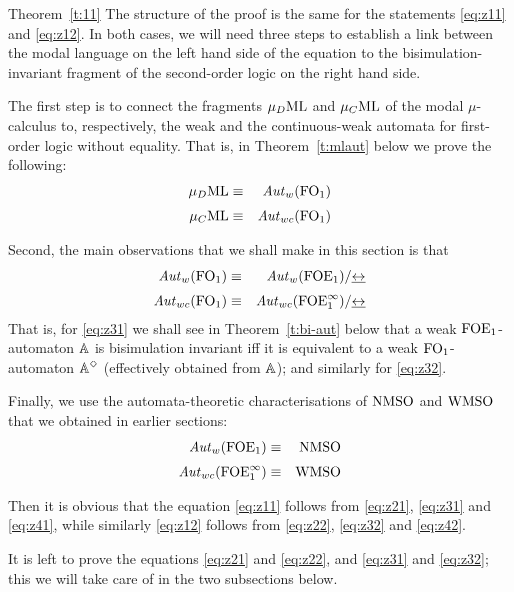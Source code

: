 \begin{proofof}{Theorem~\ref{t:11}}
The structure of the proof is the same for the statements \eqref{eq:z11} and
\eqref{eq:z12}.
In both cases, we will need three steps to establish a link between the modal 
language on the left hand side of the equation to the bisimulation-invariant 
fragment of the second-order logic on the right hand side.

The first step is to connect the fragments $\mu_{D}\mathrm{ML}$ and $\mu_{C}\mathrm{ML}$ of the modal 
$\mu$-calculus to, respectively, the weak and the continuous-weak automata for
first-order logic without equality.
That is, in Theorem~\ref{t:mlaut} below we prove the following:
\begin{eqnarray}
   \AFMC &\equiv& \AutW(\ofo)
   \label{eq:z21}
\\[1mm] \mucML &\equiv&  \AutWC(\ofo)
   \label{eq:z22}
\end{eqnarray}

Second, the main observations that we shall make in this section is that 
\begin{eqnarray}
\AutW(\ofo)  &\equiv& \AutW(\ofoe)/{\bis} 
   \label{eq:z31}
\\[1mm] 
\AutWC(\ofo) &\equiv&  \AutWC(\ofoei)/ {\bis} 
   \label{eq:z32}
\end{eqnarray}
That is, for \eqref{eq:z31} we shall see in Theorem~\ref{t:bi-aut} below that a
weak $\mathrm{FOE}_1$-automaton $\mathbb{A}$ is bisimulation invariant iff it is equivalent to
a weak $\mathrm{FO}_1$-automaton $\mathbb{A}^{\Diamond}$ (effectively obtained from $\mathbb{A}$);
and similarly for \eqref{eq:z32}.

Finally, we use the automata-theoretic characterisations of $\mathrm{NMSO}$ and $\mathrm{WMSO}$
that we obtained in earlier sections:
\begin{eqnarray}
\AutW(\ofoe)   &\equiv&  \nmso
   \label{eq:z41}
\\[1mm] 
\AutWC(\ofoei) &\equiv&  \wmso 
   \label{eq:z42}
\end{eqnarray}

Then it is obvious that the equation \eqref{eq:z11} follows from \eqref{eq:z21},
\eqref{eq:z31} and \eqref{eq:z41}, while similarly 
\eqref{eq:z12} follows from \eqref{eq:z22}, \eqref{eq:z32} and \eqref{eq:z42}.
\end{proofof}

It is left to prove the equations \eqref{eq:z21} and \eqref{eq:z22}, and 
\eqref{eq:z31} and  \eqref{eq:z32}; this we will take care of in the two 
subsections below.

